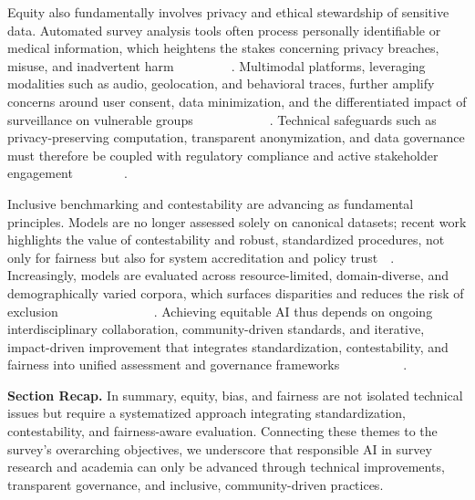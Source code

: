 \documentclass[sigconf]{acmart}
\begin{document}
Equity also fundamentally involves privacy and ethical stewardship of sensitive data. Automated survey analysis tools often process personally identifiable or medical information, which heightens the stakes concerning privacy breaches, misuse, and inadvertent harm~\cite{ref7}~\cite{ref10}~\cite{ref14}~\cite{ref45}~\cite{ref53}~\cite{ref80}~\cite{ref82}~\cite{ref89}~\cite{ref100}. Multimodal platforms, leveraging modalities such as audio, geolocation, and behavioral traces, further amplify concerns around user consent, data minimization, and the differentiated impact of surveillance on vulnerable groups~\cite{ref7}~\cite{ref9}~\cite{ref14}~\cite{ref23}~\cite{ref24}~\cite{ref53}~\cite{ref84}~\cite{ref85}~\cite{ref89}~\cite{ref90}~\cite{ref91}~\cite{ref100}. Technical safeguards such as privacy-preserving computation, transparent anonymization, and data governance must therefore be coupled with regulatory compliance and active stakeholder engagement~\cite{ref14}~\cite{ref39}~\cite{ref41}~\cite{ref90}~\cite{ref91}~\cite{ref100}~\cite{ref105}~\cite{ref106}.

Inclusive benchmarking and contestability are advancing as fundamental principles. Models are no longer assessed solely on canonical datasets; recent work highlights the value of contestability and robust, standardized procedures, not only for fairness but also for system accreditation and policy trust~\cite{ref24}~\cite{ref53}. Increasingly, models are evaluated across resource-limited, domain-diverse, and demographically varied corpora, which surfaces disparities and reduces the risk of exclusion~\cite{ref4}~\cite{ref10}~\cite{ref13}~\cite{ref51}~\cite{ref53}~\cite{ref66}~\cite{ref70}~\cite{ref84}~\cite{ref85}~\cite{ref91}~\cite{ref92}~\cite{ref94}~\cite{ref96}~\cite{ref105}~\cite{ref106}. Achieving equitable AI thus depends on ongoing interdisciplinary collaboration, community-driven standards, and iterative, impact-driven improvement that integrates standardization, contestability, and fairness into unified assessment and governance frameworks~\cite{ref39}~\cite{ref64}~\cite{ref70}~\cite{ref76}~\cite{ref80}~\cite{ref83}~\cite{ref91}~\cite{ref93}~\cite{ref99}~\cite{ref106}.

\textbf{Section Recap.} In summary, equity, bias, and fairness are not isolated technical issues but require a systematized approach integrating standardization, contestability, and fairness-aware evaluation. Connecting these themes to the survey's overarching objectives, we underscore that responsible AI in survey research and academia can only be advanced through technical improvements, transparent governance, and inclusive, community-driven practices.
\end{document}
